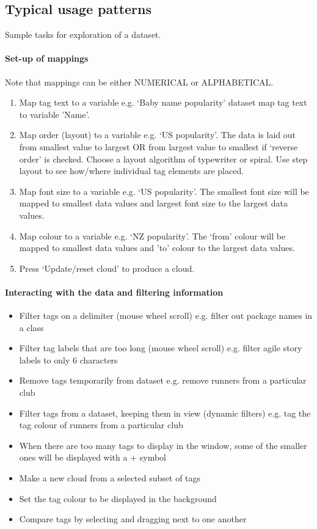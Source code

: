 \newpage
\subsection{Typical usage patterns}\label{sect:usagepatterns}

Sample tasks for exploration of a dataset.

\paragraph{Set-up of mappings}
Note that mappings can be either NUMERICAL or ALPHABETICAL. 

\begin{enumerate}
\item Map tag text to a variable e.g. `Baby name popularity' dataset map tag text to variable 'Name'.
\item Map order (layout) to a variable e.g. `US popularity'. The data is laid out from smallest value to largest OR from largest value to smallest if `reverse order' is checked. Choose a layout algorithm of typewriter or spiral. Use step layout to see how/where individual tag elements are placed.
\item Map font size to a variable e.g. `US popularity'. The smallest font size will be mapped to smallest data values and largest font size to the largest data values.
\item Map colour to a variable e.g. `NZ popularity'. The `from' colour will be mapped to smallest data values and 'to' colour to the largest data values. 
\item Press `Update/reset cloud' to produce a cloud.
\end{enumerate}


\paragraph{Interacting with the data and filtering information}

\begin{itemize}
\item Filter tags on a delimiter (mouse wheel scroll) e.g. filter out package names in a class
\item Filter tag labels that are too long (mouse wheel scroll) e.g. filter agile story labels to only 6 characters
\item Remove tags temporarily from dataset e.g. remove runners from a particular club
\item Filter tags from a dataset, keeping them in view (dynamic filters) e.g. tag the tag colour of runners from a particular club
\item When there are too many tags to display in the window, some of the smaller ones will be displayed with a + symbol
\item Make a new cloud from a selected subset of tags
\item Set the tag colour to be displayed in the background
\item Compare tags by selecting and dragging next to one another
\end{itemize}


